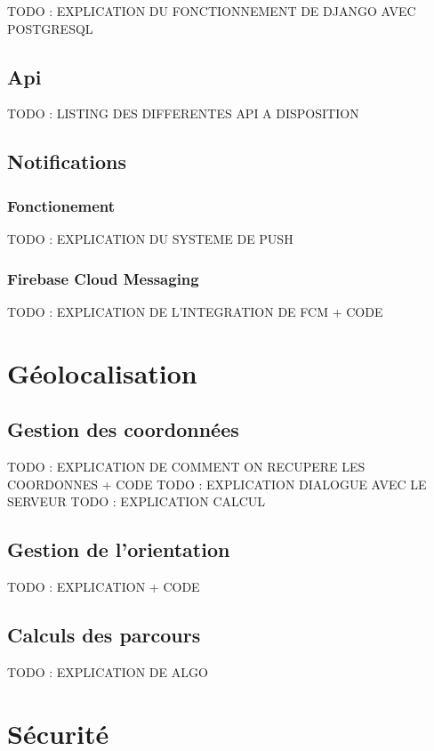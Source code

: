 \documentclass[french]{article}
\begin{document}
	TODO : EXPLICATION DU FONCTIONNEMENT DE DJANGO AVEC POSTGRESQL
	
	\subsection{Api}
	
	TODO : LISTING DES DIFFERENTES API A DISPOSITION
	
	\subsection{Notifications}
	\subsubsection{Fonctionement}
	
	TODO : EXPLICATION DU SYSTEME DE PUSH
	
	\subsubsection{Firebase Cloud Messaging}
	
	TODO : EXPLICATION DE L'INTEGRATION DE FCM + CODE
	
	\section{Géolocalisation}
	\subsection{Gestion des coordonnées}
	
	TODO : EXPLICATION DE COMMENT ON RECUPERE LES COORDONNES + CODE
	TODO : EXPLICATION DIALOGUE AVEC LE SERVEUR
	TODO : EXPLICATION CALCUL
	
	\subsection{Gestion de l'orientation}
	
	TODO : EXPLICATION + CODE
	
	\subsection{Calculs des parcours}
	
	TODO : EXPLICATION DE ALGO
	
	\section{Sécurité}
	
\end{document}
